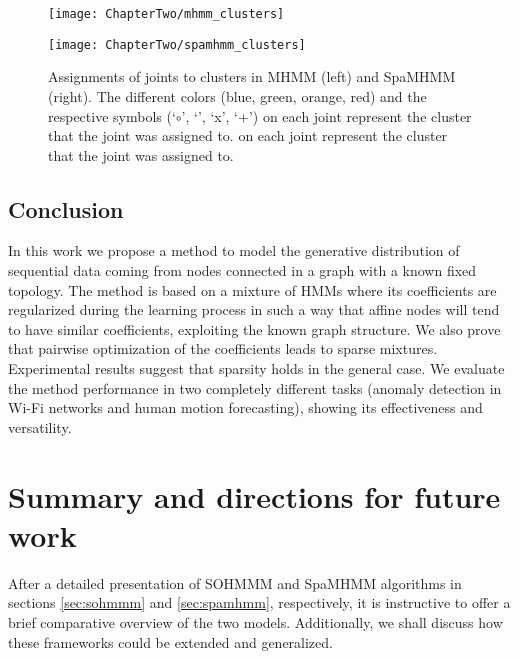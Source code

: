 \begin{figure*}
	\centering
	\begin{minipage}{.5\textwidth}
		\centering
		\texttt{[image: ChapterTwo/mhmm\_clusters]}
	\end{minipage}%
	\begin{minipage}{.5\textwidth}
		\centering
		\texttt{[image: ChapterTwo/spamhmm\_clusters]}
	\end{minipage}
	\caption{Assignments of joints to clusters in MHMM (left) and SpaMHMM (right). The different colors (blue, green, orange, red) and the respective symbols (`$\circ$', `\SmallTriangleUp', `x', `+') on each joint represent the cluster that the joint was assigned to. on each joint represent the cluster that the joint was assigned to.}
	\label{fig:clusters}
\end{figure*}

\subsection{Conclusion}
In this work we propose a method to model the generative distribution of sequential data coming from nodes connected in a graph with a known fixed topology. The method is based on a mixture of HMMs where its coefficients are regularized during the learning process in such a way that affine nodes will tend to have similar coefficients, exploiting the known graph structure. We also prove that pairwise optimization of the coefficients leads to sparse mixtures. Experimental results suggest that sparsity holds in the general case. We evaluate the method performance in two completely different tasks (anomaly detection in Wi-Fi networks and human motion forecasting), showing its effectiveness and versatility.

\section{Summary and directions for future work}
\label{sec:summary}
After a detailed presentation of SOHMMM and SpaMHMM algorithms in sections \ref{sec:sohmmm} and \ref{sec:spamhmm}, respectively, it is instructive to offer a brief comparative overview of the two models. Additionally, we shall discuss how these frameworks could be extended and generalized.


